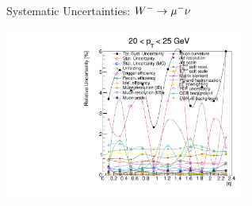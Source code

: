 \begin{frame}{Systematic Uncertainties: $W^- \rightarrow \mu^- \nu$}
 \begin{center}
   \includegraphics[width=0.6\textwidth]{dates/20121219/figures/xsec/NEG/Wmn_Unc_2d_Slice_1.pdf}
 \end{center}
\end{frame}

